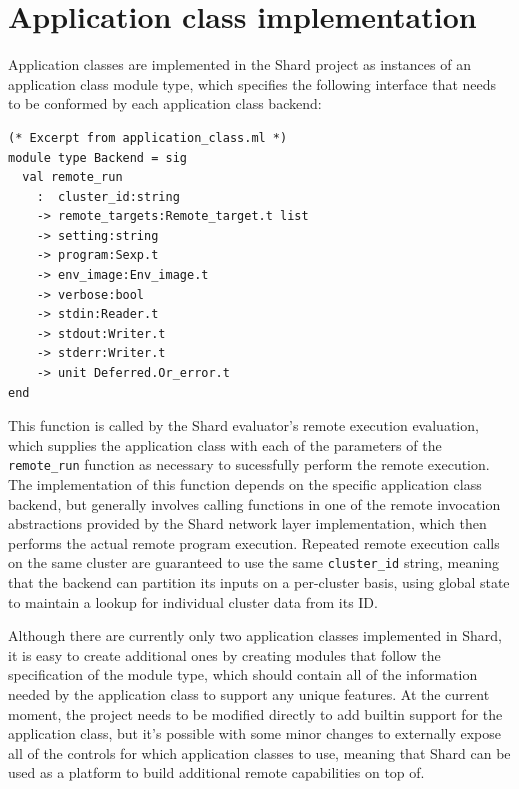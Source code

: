 \documentclass[twoside]{report}
\begin{document}
\section{Application class implementation}


Application classes are implemented in the Shard project as instances of an application class module type, which specifies the following interface that needs to be conformed by each application class backend:

\begin{lstlisting}
(* Excerpt from application_class.ml *)
module type Backend = sig
  val remote_run
    :  cluster_id:string
    -> remote_targets:Remote_target.t list
    -> setting:string
    -> program:Sexp.t
    -> env_image:Env_image.t
    -> verbose:bool
    -> stdin:Reader.t
    -> stdout:Writer.t
    -> stderr:Writer.t
    -> unit Deferred.Or_error.t
end
\end{lstlisting}

This function is called by the Shard evaluator's remote execution evaluation, which supplies the application class with each of the parameters of the \texttt{remote\_run} function as necessary to sucessfully perform the remote execution.
The implementation of this function depends on the specific application class backend, but generally involves calling functions in one of the remote invocation abstractions provided by the Shard network layer implementation, which then performs the actual remote program execution.
Repeated remote execution calls on the same cluster are guaranteed to use the same \texttt{cluster\_id} string, meaning that the backend can partition its inputs on a per-cluster basis, using global state to maintain a lookup for individual cluster data from its ID.

Although there are currently only two application classes implemented in Shard, it is easy to create additional ones by creating modules that follow the specification of the module type, which should contain all of the information needed by the application class to support any unique features.
At the current moment, the project needs to be modified directly to add builtin support for the application class, but it's possible with some minor changes to externally expose all of the controls for which application classes to use, meaning that Shard can be used as a platform to build additional remote capabilities on top of.
\end{document}
